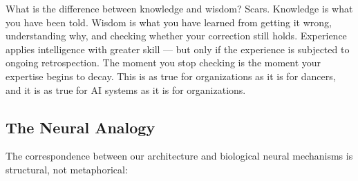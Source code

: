 \documentclass[11pt,a4paper]{article}
\begin{document}
What is the difference between knowledge and wisdom? Scars. Knowledge is what you have been told. Wisdom is what you have learned from getting it wrong, understanding why, and checking whether your correction still holds. Experience applies intelligence with greater skill --- but only if the experience is subjected to ongoing retrospection. The moment you stop checking is the moment your expertise begins to decay. This is as true for organizations as it is for dancers, and it is as true for AI systems as it is for organizations.

\subsection{The Neural Analogy}

The correspondence between our architecture and biological neural mechanisms is structural, not metaphorical:
\end{document}
